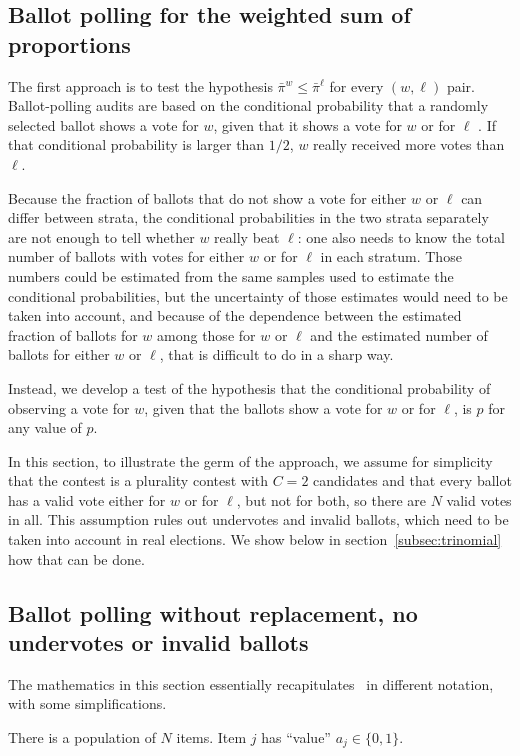 \documentclass[12pt]{article}
\newcommand{\bpi}{\bar{\pi}}
\begin{document}
\subsection{Ballot polling for the weighted sum of proportions}
The first approach is to test the hypothesis 
$\bpi^w \le \bpi^\ell$ for every $(w, \ell)$ pair.
Ballot-polling audits are based on the conditional 
probability that a randomly selected
ballot shows a vote for $w$, given that it shows a vote for $w$ or for $\ell$
\citep{lindemanStark12,lindemanEtal12}.
If that conditional probability is larger than $1/2$, $w$ really received more votes than
$\ell$.

Because the fraction of ballots that do not show a vote for either $w$ or $\ell$ can differ
between strata, the conditional probabilities in the two strata separately are not enough
to tell whether $w$ really beat $\ell$: one also needs to know the total number of ballots with votes 
for either $w$ or for $\ell$ in each stratum.
Those numbers could be estimated from the same samples used to estimate the conditional 
probabilities, but the uncertainty of those estimates would need to be taken into account, and 
because of the dependence between the estimated fraction of ballots for $w$ among those for $w$ or $\ell$
and the estimated number of ballots for either $w$ or $\ell$, that is difficult to do in a sharp way.

Instead, we develop a test of the hypothesis that the conditional probability of observing a vote for $w$, 
given that the ballots show a vote for $w$ or for $\ell$, is $p$ for any value of $p$.

In this section, to illustrate the germ of the approach,
we assume for simplicity that the contest is a plurality contest with $C=2$ candidates and
that every ballot
has a valid vote either for $w$ or for $\ell$, but not for both, so there are $N$ valid votes in all.
This assumption rules out undervotes and invalid ballots, which need to be taken into
account in real elections. 
We show below in section~\ref{subsec:trinomial} how that can be done.


\subsection{Ballot polling without replacement, no undervotes or invalid ballots}
The mathematics in this section essentially 
recapitulates~\citet[pp43--44]{wald45} in different notation, with some simplifications.

There is a population of $N$ items. 
Item $j$ has ``value'' $a_j \in \{0, 1\}$. 
\end{document}
